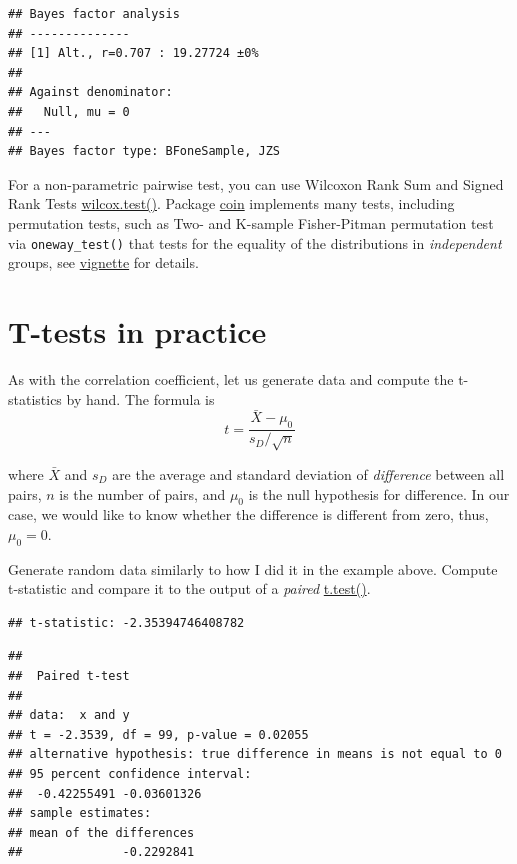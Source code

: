 \documentclass[
]{book}
\begin{document}
\begin{verbatim}
## Bayes factor analysis
## --------------
## [1] Alt., r=0.707 : 19.27724 ±0%
## 
## Against denominator:
##   Null, mu = 0 
## ---
## Bayes factor type: BFoneSample, JZS
\end{verbatim}

For a non-parametric pairwise test, you can use Wilcoxon Rank Sum and Signed Rank Tests \href{https://stat.ethz.ch/R-manual/R-devel/library/stats/html/wilcox.test.html}{wilcox.test()}. Package \href{http://coin.r-forge.r-project.org/}{coin} implements many tests, including permutation tests, such as Two- and K-sample Fisher-Pitman permutation test via \texttt{oneway\_test()} that tests for the equality of the distributions in \emph{independent} groups, see \href{https://cran.r-project.org/web/packages/coin/vignettes/coin.pdf}{vignette} for details.

\hypertarget{t-tests-in-practice}{%
\section{T-tests in practice}\label{t-tests-in-practice}}

As with the correlation coefficient, let us generate data and compute the t-statistics by hand. The formula is
\[t = \frac{\bar{X} - \mu_0}{s_D / \sqrt{n}}\]

where \(\bar{X}\) and \(s_D\) are the average and standard deviation of \emph{difference} between all pairs, \(n\) is the number of pairs, and \(\mu_0\) is the null hypothesis for difference. In our case, we would like to know whether the difference is different from zero, thus, \(\mu_0 = 0\).

Generate random data similarly to how I did it in the example above. Compute t-statistic and compare it to the output of a \emph{paired} \href{https://stat.ethz.ch/R-manual/R-devel/library/stats/html/t.test.html}{t.test()}.

\begin{verbatim}
## t-statistic: -2.35394746408782
\end{verbatim}

\begin{verbatim}
## 
##  Paired t-test
## 
## data:  x and y
## t = -2.3539, df = 99, p-value = 0.02055
## alternative hypothesis: true difference in means is not equal to 0
## 95 percent confidence interval:
##  -0.42255491 -0.03601326
## sample estimates:
## mean of the differences 
##              -0.2292841
\end{verbatim}
\end{document}
